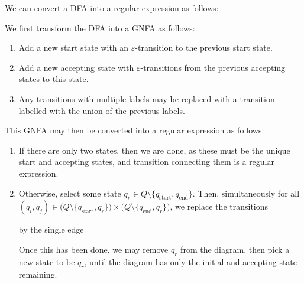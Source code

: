 \documentclass{article}
\theoremstyle{definition}
\theoremstyle{definition}
\theoremstyle{remark}
\begin{document}
We can convert a DFA into a regular expression as follows:

We first transform the DFA into a GNFA as follows:
\begin{enumerate}
    \item Add a new start state with an $\varepsilon$-transition to the previous start state.
    \item Add a new accepting state with $\varepsilon$-transitions from the previous accepting states to this state.
    \item Any transitions with multiple labels may be replaced with a transition labelled with the union of the previous labels.
\end{enumerate}
This GNFA may then be converted into a regular expression as follows:
\begin{enumerate}
    \item If there are only two states, then we are done, as these must be the unique start and accepting states, and transition connecting them is a regular expression.
    \item Otherwise, select some state $q_r\in Q\setminus\{q_\text{start},q_\text{end}\}$. Then, simultaneously for all $(q_i,q_j)\in\bigl(Q\setminus\{q_\text{start},q_r\}\bigr)\times\bigl(Q\setminus\{q_\text{end},q_r\}\bigr)$, we replace the transitions

    \begin{center}
    \end{center}
    by the single edge

    \begin{center}
    \end{center}
    Once this has been done, we may remove $q_r$ from the diagram, then pick a new state to be $q_r$, until the diagram has only the initial and accepting state remaining.
\end{enumerate}
\end{document}
